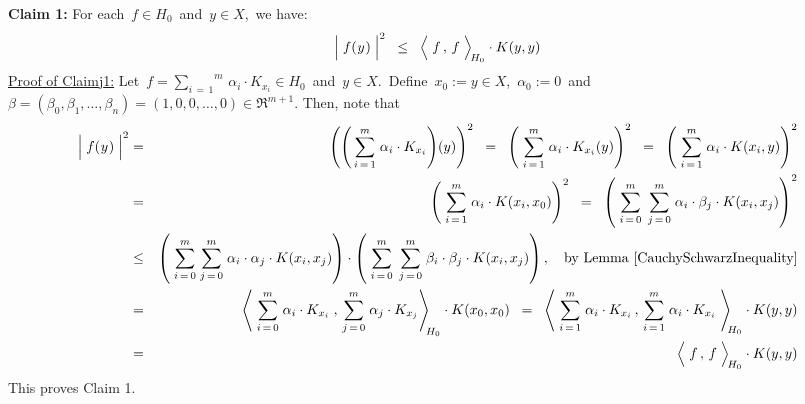 \vskip 0.5cm
\noindent
\textbf{Claim 1:}\quad
For each \,$f \in H_{0}$\, and \,$y \in X$,\, we have:
\begin{equation*}
\left\vert\;f(\overset{{\color{white}-}}{y})\;\right\vert^{2}
\;\; \leq \;\;
	\left\langle\; \overset{{\color{white}.}}{f} \,,\, f \;\right\rangle_{\!H_{0}}
	\cdot
	K(y,y)
\end{equation*}
\underline{Proof of Claim{\color{white}j}1:}
\vskip0.2cm
\noindent
Let
\,$f = \overset{m}{\underset{i\,=\,1}{\sum}}\, \alpha_{i} \cdot K_{x_{i}} \in H_{0}$\,
and
\,$y \in X$.\,
Define \,$x_{0} := y \in X$,\, $\alpha_{0} := 0$\, and
\,$\beta = (\beta_{0},\beta_{1},\ldots,\beta_{n}) = (1,0,0,\ldots,0) \in \Re^{m+1}$.
Then, note that
\begin{eqnarray*}
\left\vert\;f(\overset{{\color{white}-}}{y})\;\right\vert^{2}
& = &
	\left(
		\left(\,\overset{m}{\underset{i\,=\,1}{\sum}}\; \alpha_{i} \cdot K_{x_{i}}\right)\!(y)
		\right)^{2}
\;\; = \;\;
	\left(\;
		\overset{m}{\underset{i\,=\,1}{\sum}}\; \alpha_{i} \cdot K_{x_{i}}(y)
		\right)^{2}
\;\; = \;\;
	\left(\;
		\overset{m}{\underset{i\,=\,1}{\sum}}\; \alpha_{i} \cdot K(x_{i},y)
		\right)^{2}
\\
& = &
	\left(\;
		\overset{m}{\underset{i\,=\,1}{\sum}}\; \alpha_{i} \cdot K(x_{i},x_{0})
		\right)^{2}
\;\; = \;\;
	\left(\;
		\overset{m}{\underset{i\,=\,0}{\sum}}\;\,
		\overset{m}{\underset{j\,=\,0}{\sum}}\;
		\alpha_{i} \cdot \beta_{j} \cdot K(x_{i},x_{j})
		\right)^{2}
\\
& \leq &
	\left(\;
		\overset{m}{\underset{i\,=\,0}{\sum}}\;
		\overset{m}{\underset{j\,=\,0}{\sum}}\;
		\alpha_{i} \cdot \alpha_{j} \cdot K(x_{i},x_{j})
		\right)
	\cdot
	\left(\;
		\overset{m}{\underset{i\,=\,0}{\sum}}\;\,
		\overset{m}{\underset{j\,=\,0}{\sum}}\;
		\beta_{i} \cdot \beta_{j} \cdot K(x_{i},x_{j})
		\right),
	\quad
	\textnormal{by Lemma \ref{CauchySchwarzInequality}}
\\
& = &
	\left\langle\;
		\overset{m}{\underset{i\,=\,0}{\sum}}\; \alpha_{i} \cdot K_{x_{i}}
		\;,\,
		\overset{m}{\underset{j\,=\,0}{\sum}}\; \alpha_{j} \cdot K_{x_{j}}
		\right\rangle_{\!\!H_{0}}
	\cdot
	K(x_{0},x_{0})
\;\; = \;\;
	\left\langle\;
		\overset{m}{\underset{i\,=\,1}{\sum}}\; \alpha_{i} \cdot K_{x_{i}}
		\,,\,
		\overset{m}{\underset{i\,=\,1}{\sum}}\; \alpha_{i} \cdot K_{x_{i}}
		\;\right\rangle_{\!\!H_{0}}
	\cdot
	K(y,y)
\\
& = &
	\left\langle\; \overset{{\color{white}.}}{f} \,,\, f \;\right\rangle_{\!H_{0}}
	\cdot
	K(y,y)
\end{eqnarray*}
This proves Claim 1.

